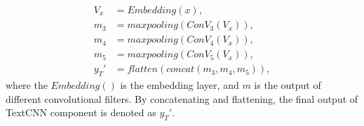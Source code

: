 \begin{align}\label{eq:tcnn}
V_x &= Embedding(x), \\
m_3 &= maxpooling(ConV_3(V_x)),\\
m_4 &= maxpooling(ConV_4(V_x)),\\
m_5 &= maxpooling(ConV_5(V_x)),\\
y_T' &= flatten(concat(m_3, m_4, m_5)),
\end{align}
where the $Embedding()$ is the embedding layer, and $m$ is the output of different convolutional filters. By concatenating and flattening, the final output of TextCNN component is denoted as $y_T'$.